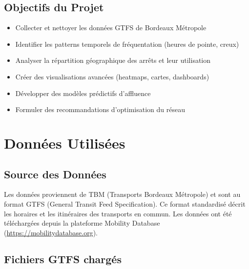 \documentclass[12pt,a4paper]{article}
\begin{document}
\subsection{Objectifs du Projet}

\begin{itemize}[leftmargin=2cm]
    \item Collecter et nettoyer les données GTFS de Bordeaux Métropole
    \item Identifier les patterns temporels de fréquentation (heures de pointe, creux)
    \item Analyser la répartition géographique des arrêts et leur utilisation
    \item Créer des visualisations avancées (heatmaps, cartes, dashboards)
    \item Développer des modèles prédictifs d'affluence
    \item Formuler des recommandations d'optimisation du réseau
\end{itemize}

\newpage
\section{Données Utilisées}

\subsection{Source des Données}

Les données proviennent de TBM (Transports Bordeaux Métropole) et sont au format GTFS (General Transit Feed Specification). Ce format standardisé décrit les horaires et les itinéraires des transports en commun. Les données ont été téléchargées depuis la plateforme Mobility Database (\url{https://mobilitydatabase.org}).

\subsection{Fichiers GTFS chargés}
\end{document}
